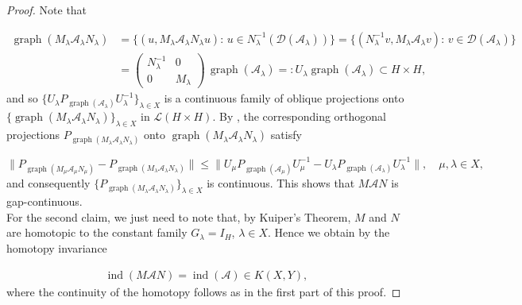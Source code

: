 \documentclass[a4paper,10pt]{article}
\DeclareMathOperator{\ind}{ind}
\DeclareMathOperator{\gra}{graph}
\begin{document}
\begin{proof}
Note that

\begin{align*}
\gra(M_\lambda\mathcal{A}_\lambda N_\lambda)&=\{(u,M_\lambda\mathcal{A}_\lambda N_\lambda u):\, u\in N^{-1}_\lambda(\mathcal{D}(\mathcal{A}_\lambda))\}=\{(N^{-1}_\lambda v,M_\lambda\mathcal{A}_\lambda v):\,v\in\mathcal{D}(\mathcal{A}_\lambda)\}\\
&=\begin{pmatrix}
N^{-1}_\lambda&0\\
0&M_\lambda
\end{pmatrix}\,\gra(\mathcal{A}_\lambda)=:U_\lambda\gra(\mathcal{A}_\lambda)\subset H\times H,
\end{align*}
and so $\{U_\lambda P_{\gra(\mathcal{A}_\lambda)}U^{-1}_\lambda\}_{\lambda\in X}$ is a continuous family of oblique projections onto\linebreak $\{\gra(M_\lambda\mathcal{A}_\lambda N_\lambda)\}_{\lambda\in X}$ in $\mathcal{L}(H\times H)$. By \cite[Thm. I.6.35]{Kato}, the corresponding orthogonal projections $P_{\gra(M_\lambda\mathcal{A}_\lambda N_\lambda)}$ onto $\gra(M_\lambda\mathcal{A}_\lambda N_\lambda)$ satisfy

\[\|P_{\gra(M_\mu\mathcal{A}_\mu N_\mu)}-P_{\gra(M_\lambda\mathcal{A}_\lambda N_\lambda)}\|\leq \|U_\mu P_{\gra(\mathcal{A}_\mu)}U^{-1}_\mu-U_\lambda P_{\gra(\mathcal{A}_\lambda)}U^{-1}_\lambda\|,\quad \mu,\lambda\in X,\]
and consequently $\{P_{\gra(M_\lambda\mathcal{A}_\lambda N_\lambda)}\}_{\lambda\in X}$ is continuous. This shows that $M\mathcal{A}N$ is gap-continuous.\\ 
For the second claim, we just need to note that, by Kuiper's Theorem, $M$ and $N$ are homotopic to the constant family $G_\lambda=I_H$, $\lambda\in X$. Hence we obtain by the homotopy invariance

\begin{align*}
\ind(M\mathcal{A}N)=\ind(\mathcal{A})\in K(X,Y),
\end{align*}
where the continuity of the homotopy follows as in the first part of this proof.
\end{proof}


\end{document}

